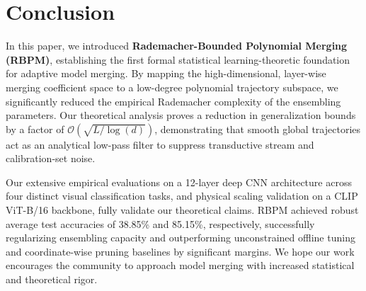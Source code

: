 \section{Conclusion}
\label{sec:conclusion}

In this paper, we introduced \textbf{Rademacher-Bounded Polynomial Merging (RBPM)}, establishing the first formal statistical learning-theoretic foundation for adaptive model merging. By mapping the high-dimensional, layer-wise merging coefficient space to a low-degree polynomial trajectory subspace, we significantly reduced the empirical Rademacher complexity of the ensembling parameters. Our theoretical analysis proves a reduction in generalization bounds by a factor of $\mathcal{O}(\sqrt{L / \log(d)})$, demonstrating that smooth global trajectories act as an analytical low-pass filter to suppress transductive stream and calibration-set noise.

Our extensive empirical evaluations on a 12-layer deep CNN architecture across four distinct visual classification tasks, and physical scaling validation on a CLIP ViT-B/16 backbone, fully validate our theoretical claims. RBPM achieved robust average test accuracies of 38.85\% and 85.15\%, respectively, successfully regularizing ensembling capacity and outperforming unconstrained offline tuning and coordinate-wise pruning baselines by significant margins. We hope our work encourages the community to approach model merging with increased statistical and theoretical rigor.
